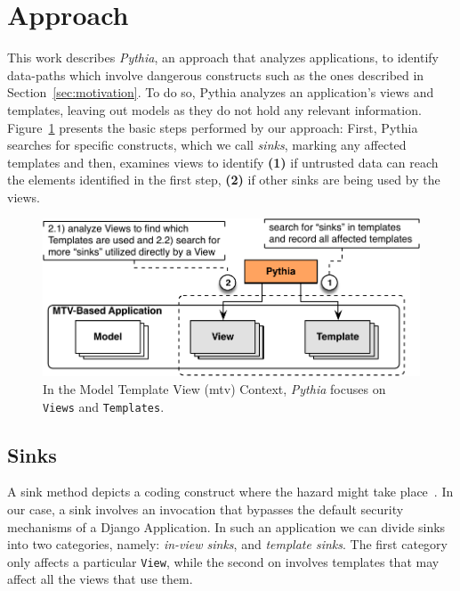 \section{Approach}
\label{sec:approach}

This work describes {\it Pythia},
an approach that analyzes applications,
to identify data-paths
which involve dangerous constructs such
as the ones described in Section~\ref{sec:motivation}.
To do so,
Pythia analyzes an application's
views and templates,
leaving out models as they do not hold any relevant information.
Figure~\ref{fig:arch} presents the basic steps performed by our approach:
First,
Pythia searches for specific constructs,
which we call {\it sinks},
marking any affected templates and then,
examines views to identify
\textbf{(1)} if untrusted data can reach
the elements identified in the first step,
\textbf{(2)} if other sinks are being used by the views.

\vspace{-2mm}

\begin{figure}[t]
    \begin{center}
        \includegraphics[scale=0.45]{MVC_and_Pythia_2.pdf}
        \vspace{-3mm}
        \caption{In the Model Template View ({\sc mtv}) Context, {\it Pythia} focuses on {\tt Views} and {\tt Templates}.}\label{fig:arch}
    \end{center}
    \vspace{-6mm}
\end{figure}

\subsection{Sinks}
\label{sec:sinks}

A sink method depicts a coding construct
where the hazard might take place~\cite{MLPK17}.
In our case,
a sink involves an invocation that bypasses
the default security mechanisms of a Django
Application.
In such an application we can divide sinks
into two categories,
namely:
{\it in-view sinks},
and {\it template sinks}.
The first category
only affects a particular {\tt View},
while the second on involves templates
that may affect all the views that use them. 

